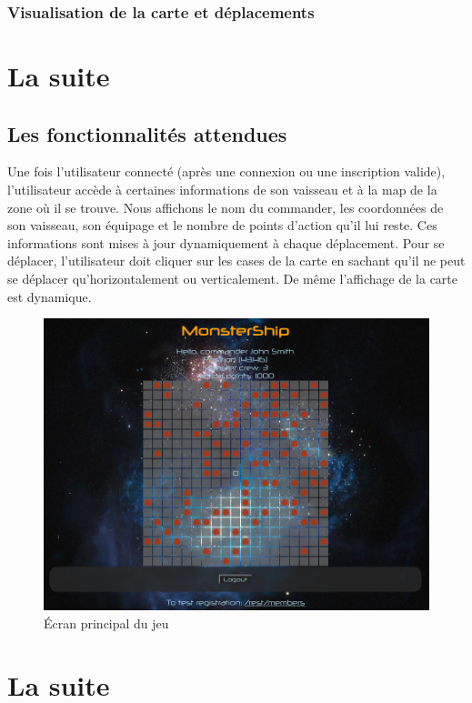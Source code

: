 \documentclass[a4paper,11pt]{report}
\begin{document}
    \subsection{Visualisation de la carte et déplacements}


\chapter{La suite}

  \section{Les fonctionnalités attendues}
      Une fois l'utilisateur connecté (après une connexion ou une inscription valide), l'utilisateur accède à certaines informations de son vaisseau et à la map de la zone où il se trouve.
      Nous affichons le nom du commander, les coordonnées de son vaisseau, son équipage et le nombre de points d'action qu'il lui reste. Ces informations sont mises à jour dynamiquement à chaque déplacement.
      Pour se déplacer, l'utilisateur doit cliquer sur les cases de la carte en sachant qu'il ne peut se déplacer qu'horizontalement ou verticalement. De même l'affichage de la carte est dynamique.
      \begin{figure}[H]
        \begin{center}
          \includegraphics[width=.8\textwidth]{images/home.png}
          \caption{Écran principal du jeu}
          \label{fig:ec_home}
        \end{center}
      \end{figure}

    

\chapter{La suite}
\end{document}
